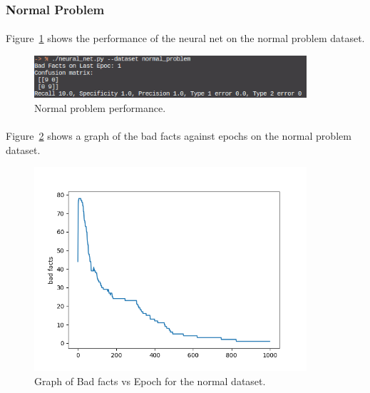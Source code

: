 \documentclass[11pt, a4paper]{article}
\begin{document}
            \subsubsection{Normal Problem}
            \paragraph{}Figure~\ref{fig:normal_problem_perf} shows the performance of the neural net on the normal problem dataset.
            \begin{figure}[H]
                \centering
                \includegraphics[width=0.9\textwidth, keepaspectratio]{normal_problem_stats.png}
                \caption{Normal problem performance.}
                \label{fig:normal_problem_perf}
            \end{figure}
            \paragraph{}Figure~\ref{fig:normal_problem_bad_epoch} shows  a graph of the bad facts against epochs on the normal problem dataset.
            \begin{figure}[H]
                \centering
                \includegraphics[width=0.9\textwidth, keepaspectratio]{normal_problem.png}
                \caption{Graph of Bad facts vs Epoch for the normal dataset.}
                \label{fig:normal_problem_bad_epoch}
            \end{figure}
\end{document}
